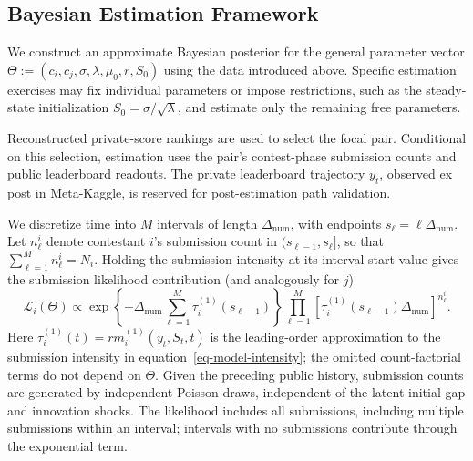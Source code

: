 \documentclass[mnsc]{informs3}
\begin{document}
\subsection{Bayesian Estimation Framework}

{We construct an approximate Bayesian posterior for the general parameter vector $\Theta:=(c_i,c_j,\sigma,\lambda,\mu_0,r,S_0)$ using the data introduced above. Specific estimation exercises may fix individual parameters or impose restrictions, such as the steady-state initialization $S_0=\sigma/\sqrt\lambda$, and estimate only the remaining free parameters.}

{Reconstructed private-score rankings are used to select the focal pair. Conditional on this selection, estimation uses the pair's contest-phase submission counts and public leaderboard readouts. The private leaderboard trajectory $y_t$, observed ex post in Meta-Kaggle, is reserved for post-estimation path validation.}

{We discretize time into $M$ intervals of length $\Delta_{\mathrm{num}}$, with endpoints $s_\ell=\ell\Delta_{\mathrm{num}}$. Let $n^i_\ell$ denote contestant $i$'s submission count in $(s_{\ell-1},s_\ell]$, so that $\sum_{\ell=1}^M n^i_\ell=N_i$. Holding the submission intensity at its interval-start value gives the submission likelihood contribution (and analogously for $j$)}
\begin{equation}\label{eq-ihpp-prob}
{\mathcal L_i(\Theta)
\propto
\exp\!\left\{-\Delta_{\mathrm{num}}\sum_{\ell=1}^M\tau_i^{(1)}(s_{\ell-1})\right\}
\prod_{\ell=1}^M
\left[\tau_i^{(1)}(s_{\ell-1})\Delta_{\mathrm{num}}\right]^{n^i_\ell}.}
\end{equation}
{Here $\tau_i^{(1)}(t)=r m_i^{(1)}(\tilde y_t,S_t,t)$ is the leading-order approximation to the submission intensity in equation~\eqref{eq-model-intensity}; the omitted count-factorial terms do not depend on $\Theta$. Given the preceding public history, submission counts are generated by independent Poisson draws, independent of the latent initial gap and innovation shocks. The likelihood includes all submissions, including multiple submissions within an interval; intervals with no submissions contribute through the exponential term.}
\end{document}
